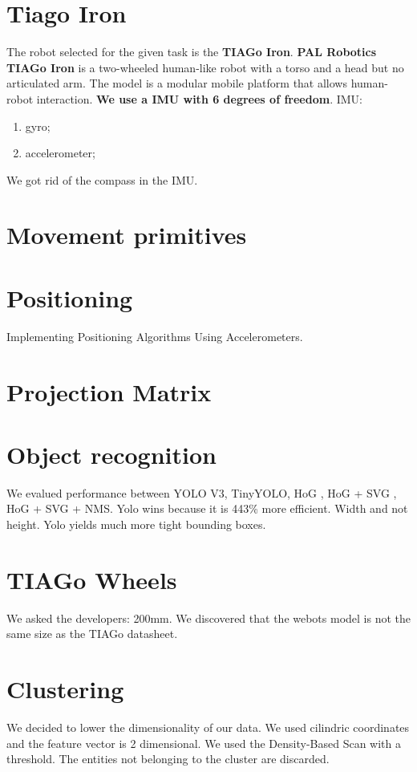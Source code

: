 \documentclass[a4paper]{article}
\begin{document}
	\section{Tiago Iron} 
	The robot selected for the given task is the \textbf{TIAGo Iron}. \newline\textbf{PAL Robotics TIAGo Iron}\cite{tiagoiron} is a two-wheeled human-like robot with a torso and a head but no articulated arm. The model is a modular mobile platform that allows human-robot interaction.
	\textbf{We use a IMU with 6 degrees of freedom}.
	IMU:
		\begin{enumerate}
			\item gyro;	
			\item accelerometer;
		\end{enumerate}
	
	We got rid of the compass in the IMU.
	
	\section{Movement primitives}
	\cite{positioning}
	
	\section{Positioning}
	Implementing Positioning Algorithms Using Accelerometers.
	
	\section{Projection Matrix}
	\cite{OpenGL}
	
	\section{Object recognition}
	We evalued performance between YOLO V3, TinyYOLO, HoG , HoG + SVG  , HoG + SVG + NMS. Yolo wins because it is 443\% more efficient. Width and not height. Yolo yields much more tight bounding boxes. 
	
	\section{TIAGo Wheels}
	We asked the developers: 200mm. We discovered that the webots model is not the same size as the TIAGo datasheet.
	
	\section{Clustering}
	We decided to lower the dimensionality of our data. We used cilindric coordinates and the feature vector is 2 dimensional.
	We used the Density-Based Scan with a threshold. The entities not belonging to the cluster are discarded.
	
\end{document}
